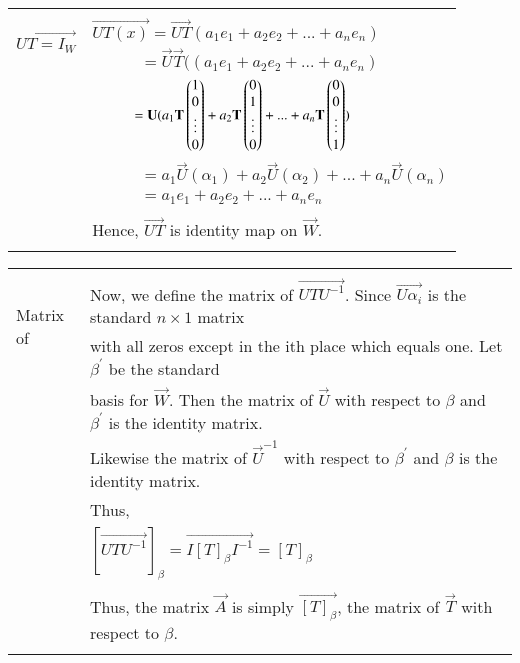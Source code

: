 \documentclass[journal,12pt,twocolumn]{IEEEtran}
\begin{document}
\begin{table}[hp]
	\begin{tabular}{|l|l|}
		\hline
		\multirow{3}{*}{$\vec{UT=I_W}$} & \\
		& $\vec{UT(x)}  = \vec{UT}(a_1e_1 + a_2e_2 + ... + a_ne_n)$ \qquad \qquad \qquad \qquad \qquad \qquad \qquad \qquad \qquad \qquad \\
		& $ \qquad \quad = \vec{U}\vec{T}((a_1e_1 + a_2e_2 + ... + a_ne_n)$ \\
		& $ \qquad \quad = \mathbf{U}(a_1\mathbf{T}\begin{pmatrix}1 \\ 0 \\ \vdots \\ 0 \end{pmatrix} + a_2\mathbf{T}\begin{pmatrix}0 \\ 1 \\ \vdots \\ 0 \end{pmatrix} + ... + a_n\mathbf{T}\begin{pmatrix}0 \\ 0 \\ \vdots \\ 1 \end{pmatrix}) $\\
		& $ \qquad \quad = a_1\vec{U}(\alpha_{1}) + a_2\vec{U}(\alpha_{2}) + ... + a_n\vec{U}(\alpha_{n})$ \\
		& $ \qquad \quad = a_1e_1 + a_2e_2 + ... + a_ne_n$ \\
		&\\
		& Hence, $\vec{UT}$ is identity map on $\vec{W}$. \\
		& \\
		\hline	
	\end{tabular}
\end{table}
\begin{table}[hp]
	\begin{tabular}{|l|l|}
		\hline
		\multirow{3}{*}{Matrix of} & \\
		& Now, we define the matrix of $\vec{UTU^{-1}}$. Since $\vec{U\alpha_{i}}$ is the standard $n \times 1$ matrix  \quad \\
\quad	$\vec{UTU^{-1}}$ & with all zeros except in the ith place which equals one. Let $\beta^{'}$ be the standard \\
 	& basis for $\vec{W}$. Then the matrix of $\vec{U}$ with respect to $\beta$ and $\beta^{'}$ is the      identity matrix. \\
	& Likewise the matrix of $\vec{U}^{-1}$ with respect to $\beta^{'}$ and $\beta$ is the identity matrix. \\
		& Thus,\\
		& \qquad \qquad \qquad $[\vec{UTU^{-1}}]_\beta = \vec{I[T]_\beta I^{-1}} = [T]_\beta$\\
		& \\
		& Thus, the matrix $\vec{A}$ is simply $\vec{[T]_\beta}$, the matrix of $\vec{T}$ with respect to $\beta$.\\
		& \\
		\hline	
	\end{tabular}
\end{table}
\end{document}
